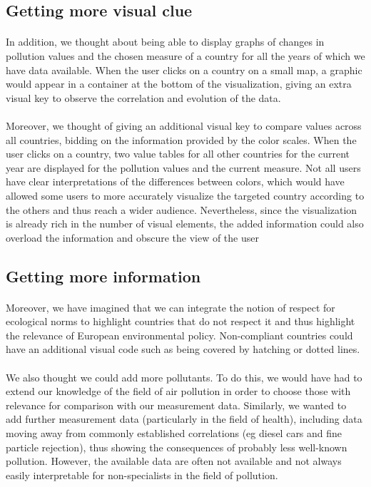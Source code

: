 \documentclass[preprint,journal]{vgtc}       %
\begin{document}
\subsection{Getting more visual clue}

\paragraph{}
In addition, we thought about being able to display graphs of changes in pollution values ​​and the chosen measure of a country for all the years of which we have data available. When the user clicks on a country on a small map, a graphic would appear in a container at the bottom of the visualization, giving an extra visual key to observe the correlation and evolution of the data. 

\paragraph{}
Moreover, we thought of giving an additional visual key to compare values ​​across all countries, bidding on the information provided by the color scales. When the user clicks on a country, two value tables for all other countries for the current year are displayed for the pollution values ​​and the current measure. Not all users have clear interpretations of the differences between colors, which would have allowed some users to more accurately visualize the targeted country according to the others and thus reach a wider audience. Nevertheless, since the visualization is already rich in the number of visual elements, the added information could also overload the information and obscure the view of the user


\subsection{Getting more information}

\paragraph{}
Moreover, we have imagined that we can integrate the notion of respect for ecological norms to highlight countries that do not respect it and thus highlight the relevance of European environmental policy. Non-compliant countries could have an additional visual code such as being covered by hatching or dotted lines.

\paragraph{}
We also thought we could add more pollutants. To do this, we would have had to extend our knowledge of the field of air pollution in order to choose those with relevance for comparison with our measurement data. Similarly, we wanted to add further measurement data (particularly in the field of health), including data moving away from commonly established correlations (eg diesel cars and fine particle rejection), thus showing the consequences of probably less well-known pollution. However, the available data are often not available and not always easily interpretable for non-specialists in the field of pollution.
		
\end{document}
